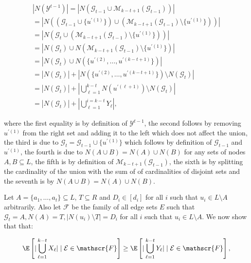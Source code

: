 \documentclass[10pt,a4paper]{article}
\begin{document}
\[\begin{gathered}
\displaystyle|N(\mathcal{Y}^{t-1})| \displaystyle=|N(\mathcal{G}_{t-1}\cup\mathcal{M}_{k-t+1}(\mathcal{G}_{t-1}))| \\
\displaystyle=|N((\mathcal{G}_{t-1}\cup\{u^{\prime(1)}\})\cup(\mathcal{M}_{k-t+1}(\mathcal{G}_{t-1})\setminus\{u^{\prime(1)}\}))| \\
\displaystyle=|N(\mathcal{G}_{t}\cup(\mathcal{M}_{k-t+1}(\mathcal{G}_{t-1})\setminus\{u^{\prime(1)}\}))| \\
\displaystyle=|N(\mathcal{G}_{t})\cup N(\mathcal{M}_{k-t+1}(\mathcal{G}_{t-1})\setminus\{u^{\prime(1)}\})| \\
\displaystyle=|N(\mathcal{G}_{t})\cup N(\{u^{\prime(2)},\dots,u^{\prime(k-t+1)}\})| \\
\displaystyle=|N(\mathcal{G}_{t})|+|N(\{u^{\prime(2)},\dots,u^{\prime(k-t+1)}\})\setminus N(\mathcal{G}_{t})| \\
\displaystyle=|N(\mathcal{G}_{t})|+|\bigcup_{\ell=1}^{k-t}{N(u^{\prime(\ell+1)})\setminus N(\mathcal{G}_{t})}| \\
\displaystyle=|N(\mathcal{G}_{t})|+|\bigcup_{\ell=1}^{i=k-t}{Y_{\ell}}|,
\end{gathered}\]


where the first equality is by definition of $\mathcal{Y}^{t-1}$, the second follows by removing $u^{\prime(1)}$ from the right set and adding it to the left which does not affect the union, the third is due to $\mathcal{G}_{t}=\mathcal{G}_{t-1}\cup\{u^{\prime(1)}\}$ which follows by definition of $\mathcal{G}_{t-1}$ and $u^{\prime(1)}$, the fourth is due to $N(A\cup B)=N(A)\cup N(B)$ for any sets of nodes $A,B\subseteq L$, the fifth is by definition of $\mathcal{M}_{k-t+1}(\mathcal{G}_{t-1})$, the sixth is by splitting the cardinality of the union with the sum of of cardinalities of disjoint sets and the seventh is by $N(A\cup B)=N(A)\cup N(B)$.\par




Let $A=\{a_{1},\dots,a_{t}\}\subseteq L$, $T\subseteq R$ and $D_{i}\in[d_{i}]$ for all $i$ such that $u_{i}\in L\setminus A$ arbitrarily. Also let $\mathscr{F}$ be the family of all edge sets $E$ such that $\mathcal{G}_{t}=A,N(A)=T,|N(u_{i})\setminus T|=D_{i}$ for all $i$ such that $u_{i}\in L\setminus A$.
We now show that that:\par


\[\begin{gathered}
\displaystyle\E\left[|\bigcup_{\ell=1}^{k-t}{X_{\ell}}|\mid\mathcal{E}\in\mathscr{F}\right]\geq\E\left[|\bigcup_{\ell=1}^{k-t}{Y_{\ell}}|\mid\mathcal{E}\in\mathscr{F}\right],
\end{gathered}\]
\end{document}
